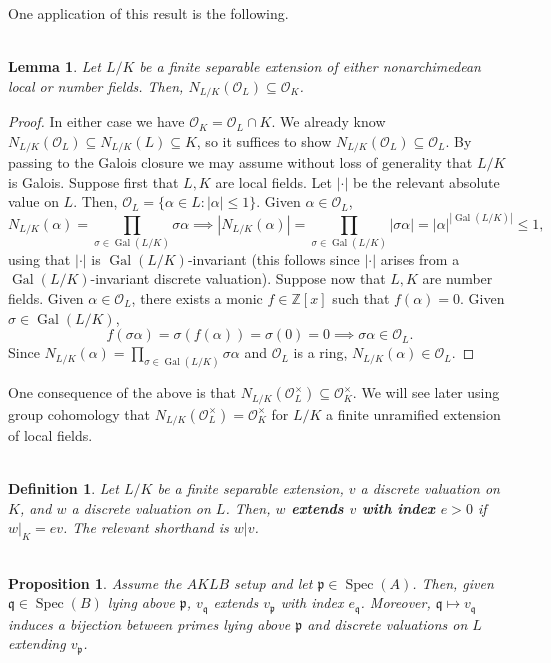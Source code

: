 \documentclass[11pt]{article}
\newcommand{\Z}{\mathbb{Z}}
\newcommand{\abs}[1]{\left\lvert#1\right\rvert}
\newcommand{\mc}[1]{\mathcal{#1}}
\newcommand{\mf}[1]{\mathfrak{#1}}
\DeclareMathOperator{\Gal}{Gal}
\DeclareMathOperator{\Spec}{Spec}
\renewcommand{\subset}{\subseteq}
\renewcommand{\O}{\mc{O}}
\newtheorem*{definition*}{\\Definition}
\newtheorem*{lemma*}{\\Lemma}
\newtheorem*{proposition*}{\\Proposition}
\begin{document}
One application of this result is the following.

\begin{lemma*}
Let $L/K$ be a finite separable extension of either nonarchimedean local or number fields. Then, $N_{L/K}(\O_L)\subset\O_K$.
\end{lemma*}
\begin{proof}
In either case we have $\O_K=\O_L\cap K$. We already know $N_{L/K}(\O_L)\subset N_{L/K}(L)\subset K$, so it suffices to show $N_{L/K}(\O_L)\subset\O_L$. By passing to the Galois closure we may assume without loss of generality that $L/K$ is Galois. Suppose first that $L,K$ are local fields. Let $\abs{\cdot}$ be the relevant absolute value on $L$. Then, $\O_L=\{\alpha\in L : |\alpha|\leq1\}$. Given $\alpha\in\O_L$,
$$N_{L/K}(\alpha)=\prod_{\sigma\in\Gal(L/K)}\sigma\alpha\implies|N_{L/K}(\alpha)|=\prod_{\sigma\in\Gal(L/K)}|\sigma\alpha|=|\alpha|^{|\Gal(L/K)|}\leq1,$$
using that $\abs{\cdot}$ is $\Gal(L/K)$-invariant (this follows since $\abs{\cdot}$ arises from a $\Gal(L/K)$-invariant discrete valuation). Suppose now that $L,K$ are number fields. Given $\alpha\in\O_L$, there exists a monic $f\in\Z[x]$ such that $f(\alpha)=0$. Given $\sigma\in\Gal(L/K)$, 
$$f(\sigma\alpha)=\sigma(f(\alpha))=\sigma(0)=0\implies\sigma\alpha\in\O_L.$$
Since $N_{L/K}(\alpha)=\prod_{\sigma\in\Gal(L/K)}\sigma\alpha$ and $\O_L$ is a ring, $N_{L/K}(\alpha)\in\O_L$.
\end{proof}

One consequence of the above is that $N_{L/K}(\O_L^{\times})\subset\O_K^{\times}$. We will see later using group cohomology that $N_{L/K}(\O_L^{\times})=\O_K^{\times}$ for $L/K$ a finite unramified extension of local fields.

\begin{definition*}
Let $L/K$ be a finite separable extension, $v$ a discrete valuation on $K$, and $w$ a discrete valuation on $L$. Then, \textbf{$w$ extends $v$ with index $e>0$} if $w|_K=ev$. The relevant shorthand is $w|v$.
\end{definition*}

\begin{proposition*}
Assume the $AKLB$ setup and let $\mf{p}\in\Spec(A)$. Then, given $\mf{q}\in\Spec(B)$ lying above $\mf{p}$, $v_{\mf{q}}$ extends $v_{\mf{p}}$ with index $e_{\mf{q}}$. Moreover, $\mf{q}\mapsto v_{\mf{q}}$ induces a bijection between primes lying above $\mf{p}$ and discrete valuations on $L$ extending $v_{\mf{p}}$. 
\end{proposition*}
\end{document}
